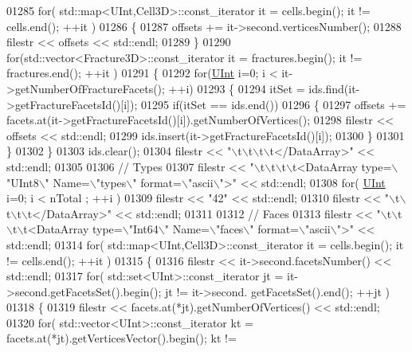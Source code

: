 \begin{DoxyCode}
01285     \textcolor{keywordflow}{for}( std::map<UInt,Cell3D>::const\_iterator it = cells.begin(); it != cells.end(); ++it )
01286     \{
01287         offsets += it->second.verticesNumber();
01288         filestr << offsets << std::endl;
01289     \}
01290     \textcolor{keywordflow}{for}(std::vector<Fracture3D>::const\_iterator it = fractures.begin(); it != fractures.end(); ++it )
01291     \{
01292         \textcolor{keywordflow}{for}(\hyperlink{namespaceFVCode3D_a4bf7e328c75d0fd504050d040ebe9eda}{UInt} i=0; i < it->getNumberOfFractureFacets(); ++i)
01293         \{
01294             itSet = ids.find(it->getFractureFacetsId()[i]);
01295             \textcolor{keywordflow}{if}(itSet == ids.end())
01296             \{
01297                 offsets += facets.at(it->getFractureFacetsId()[i]).getNumberOfVertices();
01298                 filestr << offsets << std::endl;
01299                 ids.insert(it->getFractureFacetsId()[i]);
01300             \}
01301         \}
01302     \}
01303     ids.clear();
01304     filestr << \textcolor{stringliteral}{"\(\backslash\)t\(\backslash\)t\(\backslash\)t\(\backslash\)t</DataArray>"} << std::endl;
01305 
01306     \textcolor{comment}{//  Types}
01307     filestr << \textcolor{stringliteral}{"\(\backslash\)t\(\backslash\)t\(\backslash\)t\(\backslash\)t<DataArray type=\(\backslash\)"UInt8\(\backslash\)" Name=\(\backslash\)"types\(\backslash\)" format=\(\backslash\)"ascii\(\backslash\)">"} << std::endl;
01308     \textcolor{keywordflow}{for}( \hyperlink{namespaceFVCode3D_a4bf7e328c75d0fd504050d040ebe9eda}{UInt} i=0; i < nTotal ; ++i )
01309         filestr << \textcolor{stringliteral}{"42"} << std::endl;
01310     filestr << \textcolor{stringliteral}{"\(\backslash\)t\(\backslash\)t\(\backslash\)t\(\backslash\)t</DataArray>"} << std::endl;
01311 
01312     \textcolor{comment}{//  Faces}
01313     filestr << \textcolor{stringliteral}{"\(\backslash\)t\(\backslash\)t\(\backslash\)t\(\backslash\)t<DataArray type=\(\backslash\)"Int64\(\backslash\)" Name=\(\backslash\)"faces\(\backslash\)" format=\(\backslash\)"ascii\(\backslash\)">"} << std::endl;
01314     \textcolor{keywordflow}{for}( std::map<UInt,Cell3D>::const\_iterator it = cells.begin(); it != cells.end(); ++it )
01315     \{
01316         filestr << it->second.facetsNumber() << std::endl;
01317         \textcolor{keywordflow}{for}( std::set<UInt>::const\_iterator jt = it->second.getFacetsSet().begin(); jt != it->second.
      getFacetsSet().end(); ++jt )
01318         \{
01319             filestr << facets.at(*jt).getNumberOfVertices() << std::endl;
01320             \textcolor{keywordflow}{for}( std::vector<UInt>::const\_iterator kt = facets.at(*jt).getVerticesVector().begin(); kt != 

\end{DoxyCode}
